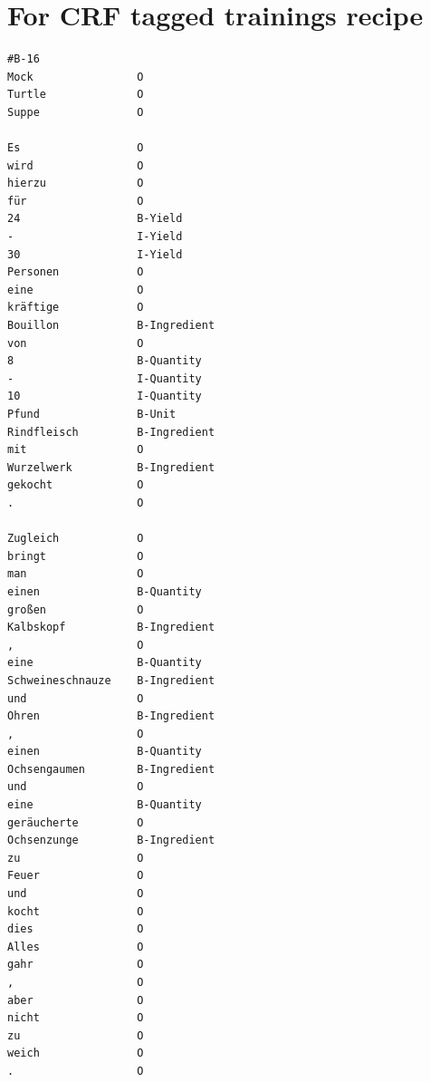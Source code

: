 \documentclass[12pt, twoside]{report}
\begin{document}
\printbibliography

\chapter{For CRF tagged trainings recipe} \label{appendix:crfTraini}
\begin{lstlisting}
#B-16                
Mock                O
Turtle              O
Suppe               O

Es                  O
wird                O
hierzu              O
für                 O
24                  B-Yield
-                   I-Yield
30                  I-Yield
Personen            O
eine                O
kräftige            O
Bouillon            B-Ingredient
von                 O
8                   B-Quantity
-                   I-Quantity
10                  I-Quantity
Pfund               B-Unit
Rindfleisch         B-Ingredient
mit                 O
Wurzelwerk          B-Ingredient
gekocht             O
.                   O

Zugleich            O
bringt              O
man                 O
einen               B-Quantity
großen              O
Kalbskopf           B-Ingredient
,                   O
eine                B-Quantity
Schweineschnauze    B-Ingredient
und                 O
Ohren               B-Ingredient
,                   O
einen               B-Quantity
Ochsengaumen        B-Ingredient
und                 O
eine                B-Quantity
geräucherte         O
Ochsenzunge         B-Ingredient
zu                  O
Feuer               O
und                 O
kocht               O
dies                O
Alles               O
gahr                O
,                   O
aber                O
nicht               O
zu                  O
weich               O
.                   O


\end{lstlisting}
\end{document}
